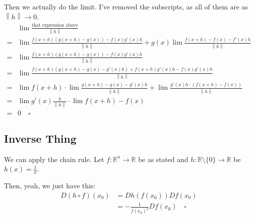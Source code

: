 \documentclass[12pt]{article}
\newcommand{\R}{\mathbb{R}}
\newcommand{\norm}[1]{\left\lVert#1\right\rVert}
\begin{document}
Then we actually do the limit.
I've removed the subscripts, as all of them are as $\norm{h} \to 0$.
\begin{align*}
      & \lim \frac{\text{that expression above}}{\norm{h}}                       \\
  ={} & \lim \frac{f(x+h)(g(x+h)-g(x))-f(x)g'(x)h}{\norm{h}}
  + g(x)\lim \frac{f(x+h)-f(x)-f'(x)h}{\norm{h}}                                 \\
  ={} & \lim \frac{f(x+h)(g(x+h)-g(x))-f(x)g'(x)h}{\norm{h}}                     \\
  ={} & \lim \frac{f(x+h)(g(x+h)-g(x)-g'(x)h)+f(x+h)g'(x)h-f(x)g'(x)h}{\norm{h}} \\
  ={} & \lim f(x+h) \cdot \lim \frac{g(x+h)-g(x)-g'(x)h}{\norm{h}}
  + \lim \frac{g'(x)h \cdot (f(x+h)-f(x))}{\norm{h}}                             \\
  ={} & \lim g'(x)\frac{h}{\norm{h}} \cdot \lim f(x+h)-f(x)               \\
  ={} & 0\quad\square
\end{align*}

\subsection{Inverse Thing}

We can apply the chain rule.
Let $f: \R^n \to \R$ be as stated and $h: \R \setminus \{0\} \to \R$ be $h(x)=\frac{1}{x}$.

Then, yeah, we just have this:
\begin{align*}
  D(h \circ f)(x_0)
   & = Dh(f(x_0))Df(x_0)                      \\
   & = -\frac{1}{f(x_0)^2}Df(x_0)\quad\square
\end{align*}
\end{document}
